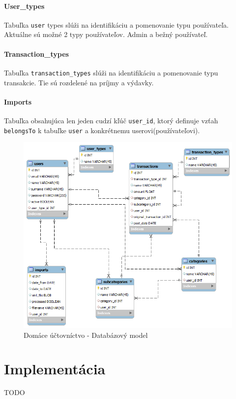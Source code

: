 \documentclass[12pt,onesided]{book}
\begin{document}
\subsubsection{User\_types}
Tabuľka \texttt{user} types slúži na identifikáciu a pomenovanie typu používateľa. Aktuálne sú možné 2 typy používateľov. Admin a bežný používateľ.
\subsubsection{Transaction\_types}
Tabuľka \texttt{transaction\_types} slúži na identifikáciu a pomenovanie typu transakcie. Tie sú rozdelené na príjmy a výdavky.
\subsubsection{Imports}
Tabuľka obsahujúca len jeden cudzí kľúč \texttt{user\_id}, ktorý definuje vzťah \texttt{belongsTo} k tabuľke \texttt{user} a konkrétnemu userovi(používateľovi).
\begin{figure}[ht]
  \centering
      \includegraphics[width=15cm]{databazovy_model}
  \caption{Domáce účtovníctvo - Databázový model}
  \label{DataModel}
\end{figure}  


\chapter{Implementácia}
TODO
\end{document}
